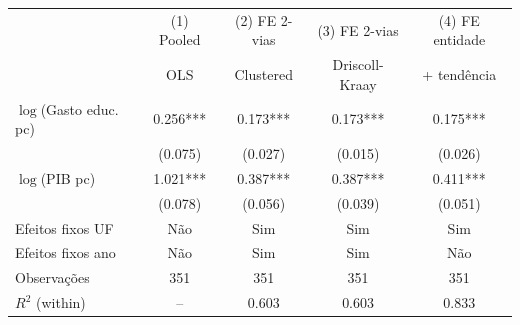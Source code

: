 \begin{tabular}{lcccc}
\toprule
 & (1) Pooled & (2) FE 2-vias & (3) FE 2-vias & (4) FE entidade \\
 & OLS & Clustered & Driscoll-Kraay & + tendência \\
\midrule
$\log$(Gasto educ. pc) & 0.256*** & 0.173*** & 0.173*** & 0.175*** \\
 & (0.075) & (0.027) & (0.015) & (0.026) \\
$\log$(PIB pc) & 1.021*** & 0.387*** & 0.387*** & 0.411*** \\
 & (0.078) & (0.056) & (0.039) & (0.051) \\
\midrule
Efeitos fixos UF & Não & Sim & Sim & Sim \\
Efeitos fixos ano & Não & Sim & Sim & Não \\
Observações & 351 & 351 & 351 & 351 \\
$R^2$ (within) & -- & 0.603 & 0.603 & 0.833 \\
\bottomrule
\end{tabular}

